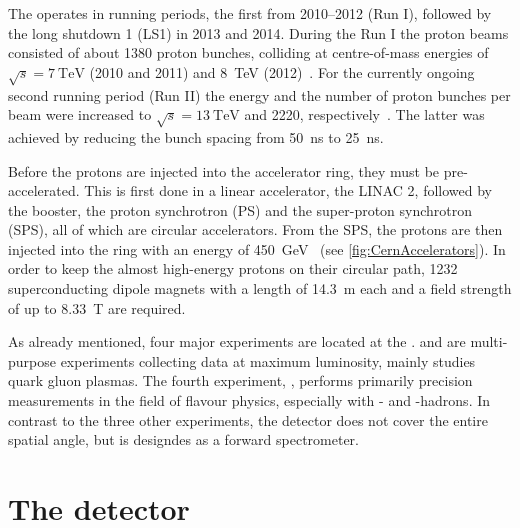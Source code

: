 The \lhc operates in running periods, the first from \numrange{2010}{2012} (Run I), followed by the long shutdown 1 (LS1) in \num{2013} and \num{2014}.
During the Run I the proton beams consisted of about \num{1380} proton bunches, colliding at centre-of-mass energies of $\sqrt{s}=\SI{7}{\tera\electronvolt}$ (\num{2010} and \num{2011}) and \SI{8}{\tera\electronvolt} (\num{2012})~\cite{LHC_statistic}.
For the currently ongoing second running period (Run II) the energy and the number of proton bunches per beam were increased to $\sqrt{s}=\SI{13}{\tera\electronvolt}$ and \num{2220}, respectively~\cite{LHC_statistic}.
The latter was achieved by reducing the bunch spacing from \SI{50}{\nano\second} to \SI{25}{\nano\second}.

Before the protons are injected into the \lhc accelerator ring, they must be pre-accelerated.
This is first done in a linear accelerator, the LINAC 2, followed by the booster, the proton synchrotron (PS) and the super-proton synchrotron (SPS), all of which are circular accelerators.
From the SPS, the protons are then injected into the \lhc ring with an energy of \SI{450}{\giga\electronvolt}~\cite{Bruening:782076} (see \cref{fig:CernAccelerators}).
In order to keep the almost high-energy protons on their circular path, \num{1232} superconducting dipole magnets with a length of \SI{14.3}{\metre} each and a field strength of up to \SI{8.33}{\tesla} are required.

As already mentioned, four major experiments are located at the \lhc.
\atlas and \cms are multi-purpose experiments collecting data at maximum luminosity, \alice mainly studies quark gluon plasmas.
The fourth experiment, \lhcb, performs primarily precision measurements in the field of flavour physics, especially with \bquark- and \cquark-hadrons.
In contrast to the three other experiments, the detector does not cover the entire spatial angle, but is designdes as a forward spectrometer.

\section{The \lhcb detector}

